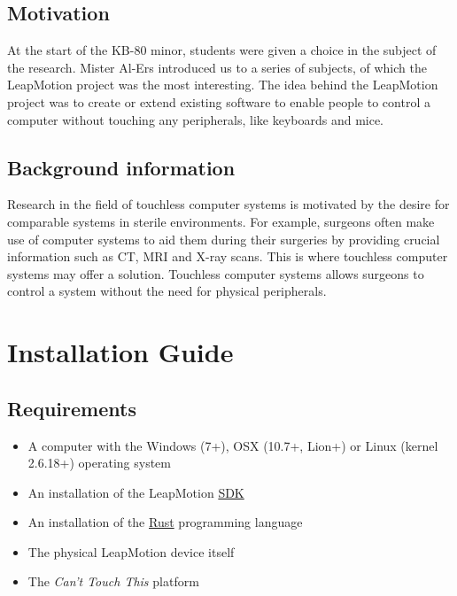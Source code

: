 \documentclass[a4paper]{article}
\providecommand{\tightlist}{%
\setlength{\itemsep}{0pt}\setlength{\parskip}{0pt}}
\begin{document}
  \subsection{Motivation}
  At the start of the KB-80 minor, students were given a choice in the subject
  of the research. Mister Al-Ers introduced us to a series of subjects, of which
  the LeapMotion project was the most interesting. The idea behind the
  LeapMotion project was to create or extend existing software to enable people
  to control a computer without touching any peripherals, like keyboards and
  mice.

  \subsection{Background information}
  Research in the field of touchless computer systems is motivated by the desire
  for comparable systems in sterile environments. For example, surgeons often
  make use of computer systems to aid them during their surgeries by providing
  crucial information such as CT, MRI and X-ray scans. This is where touchless
  computer systems may offer a solution. Touchless computer systems allows
  surgeons to control a system without the need for physical peripherals.
  \clearpage

  \section{Installation Guide}
  \subsection{Requirements}
  \begin{itemize}
    \tightlist{}
    \item A computer with the Windows (7+), OSX (10.7+, Lion+) or
      Linux (kernel 2.6.18+) operating system
    \item An installation of the LeapMotion
      \href{https://developer.leapmotion.com/sdk/v2}{SDK}
    \item An installation of the
      \href{https://rustup.rs}{Rust} programming language
    \item The physical LeapMotion device itself
    \item The \textit{Can't Touch This} platform
  \end{itemize}
\end{document}
